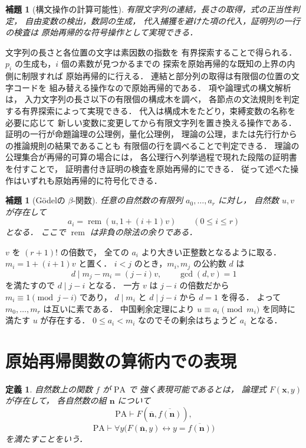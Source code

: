 \documentclass[a5paper,10pt,onecolumn]{jsarticle}
\makeatletter
\theoremstyle{mathnotetheorem}
\newtheorem{definition}[theorem]{定義}
\newtheorem{lemma}[theorem]{補題}
\renewcommand{\proofname}{証明}
\renewenvironment{proof}[1][\proofname]{%
  \par\pushQED{\qed}\normalfont\topsep4\p@\@plus2\p@\relax
  \trivlist\item[\hskip\labelsep\bfseries #1]\ignorespaces
}{\popQED\endtrivlist\@endpefalse}
\makeatother
\begin{document}
\begin{lemma}[構文操作の計算可能性]\label{lem:syntax}
有限文字列の連結，長さの取得，式の正当性判定，
自由変数の検出，数詞の生成，
代入捕獲を避けた項の代入，証明列の一行の検査は
原始再帰的な符号操作として実現できる．
\end{lemma}
\begin{proof}
文字列の長さと各位置の文字は素因数の指数を
有界探索することで得られる．
$p_i$ の生成も，$i$ 個の素数が見つかるまでの
探索を原始再帰的な既知の上界の内側に制限すれば
原始再帰的に行える．
連結と部分列の取得は有限個の位置の文字コードを
組み替える操作なので原始再帰的である．
項や論理式の構文解析は，
入力文字列の長さ以下の有限個の構成木を調べ，
各節点の文法規則を判定する有界探索によって実現できる．
代入は構成木をたどり，束縛変数の名称を必要に応じて
新しい変数に変更してから有限文字列を置き換える操作である．
証明の一行が命題論理の公理例，量化公理例，
理論の公理，または先行行からの推論規則の結果であることも
有限個の行を調べることで判定できる．
理論の公理集合が再帰的可算の場合には，
各公理行へ列挙過程で現れた段階の証明書を付すことで，
証明書付き証明の検査を原始再帰的にできる．
従って述べた操作はいずれも原始再帰的に符号化できる．
\end{proof}

\begin{lemma}[Gödelの $\beta$-関数]\label{lem:beta}
任意の自然数の有限列 $a_0,\dots,a_r$ に対し，
自然数 $u,v$ が存在して
\[
 a_i=\operatorname{rem}(u,1+(i+1)v)
 \qquad(0\le i\le r)
\]
となる．
ここで $\operatorname{rem}$ は非負の除法の余りである．
\end{lemma}
\begin{proof}
$v$ を $(r+1)!$ の倍数で，
全ての $a_i$ より大きい正整数となるように取る．
$m_i=1+(i+1)v$ と置く．
$i<j$ のとき，$m_i,m_j$ の公約数 $d$ は
\[
 d\mid m_j-m_i=(j-i)v,\qquad
 \gcd(d,v)=1
\]
を満たすので $d\mid j-i$ となる．
一方 $v$ は $j-i$ の倍数だから
$m_i\equiv1\pmod{j-i}$ であり，
$d\mid m_i$ と $d\mid j-i$ から $d=1$ を得る．
よって $m_0,\dots,m_r$ は互いに素である．
中国剰余定理により
$u\equiv a_i\pmod{m_i}$ を同時に満たす $u$ が存在する．
$0\le a_i<m_i$ なのでその剰余はちょうど $a_i$ となる．
\end{proof}

\section{原始再帰関数の算術内での表現}

\begin{definition}
自然数上の関数 $f$ が $\mathrm{PA}$ で
\emph{強く表現可能}であるとは，
論理式 $F(\boldsymbol x,y)$ が存在して，
各自然数の組 $\boldsymbol n$ について
\[
 \mathrm{PA}\vdash F(\overline{\boldsymbol n},
                     \overline{f(\boldsymbol n)}),
\]
\[
 \mathrm{PA}\vdash
 \forall y\bigl(F(\overline{\boldsymbol n},y)
 \leftrightarrow y=\overline{f(\boldsymbol n)}\bigr)
\]
を満たすことをいう．
\end{definition}
\end{document}

